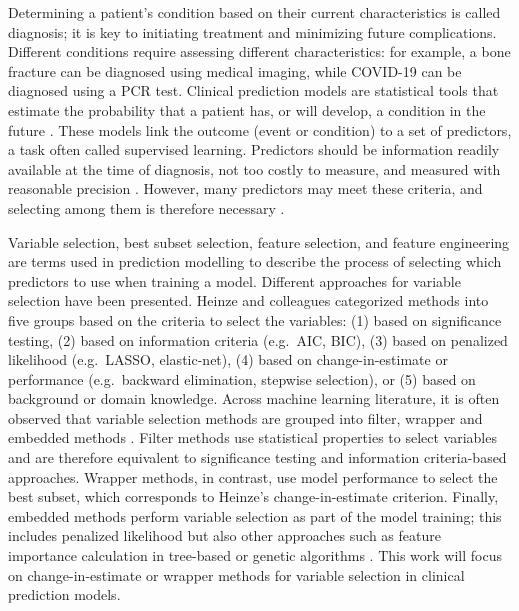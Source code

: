 Determining a patient's condition based on their current characteristics is called diagnosis; it is key to initiating treatment and minimizing future complications. Different conditions require assessing different characteristics: for example, a bone fracture can be diagnosed using medical imaging, while COVID-19 can be diagnosed using a PCR test. Clinical prediction models are statistical tools that estimate the probability that a patient has, or will develop, a condition in the future \cite{steyerberg2019clinical,jamesIntroductionStatisticalLearning2021}. These models link the outcome (event or condition) to a set of predictors, a task often called supervised learning. Predictors should be information readily available at the time of diagnosis, not too costly to measure, and measured with reasonable precision \cite{steyerberg2019clinical}. However, many predictors may meet these criteria, and selecting among them is therefore necessary \cite{chowdhuryVariableSelectionStrategies2020}.

Variable selection, best subset selection, feature selection, and feature engineering are terms used in prediction modelling to describe the process of selecting which predictors to use when training a model. Different approaches for variable selection have been presented. Heinze and colleagues \cite{heinzeVariableSelectionReview2018} categorized methods into five groups based on the criteria to select the variables: (1) based on significance testing, (2) based on information criteria (e.g.\ AIC, BIC), (3) based on penalized likelihood (e.g.\ LASSO, elastic-net), (4) based on change-in-estimate or performance (e.g.\ backward elimination, stepwise selection), or (5) based on background or domain knowledge. Across machine learning literature, it is often observed that variable selection methods are grouped into filter, wrapper and embedded methods \cite{Nguyen2025Vol1}. Filter methods use statistical properties to select variables and are therefore equivalent to significance testing and information criteria-based approaches. Wrapper methods, in contrast, use model performance to select the best subset, which corresponds to Heinze's change-in-estimate criterion. Finally, embedded methods perform variable selection as part of the model training; this includes penalized likelihood but also other approaches such as feature importance calculation in tree-based or genetic algorithms \cite{archerEmpiricalCharacterizationRandom2008,zhangVariableSelectionLogistic2018}. This work will focus on change-in-estimate or wrapper methods for variable selection in clinical prediction models.

